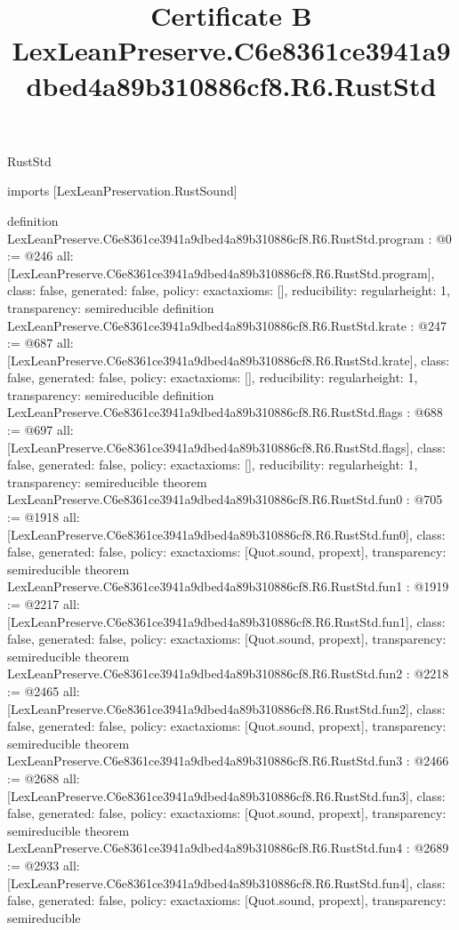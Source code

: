 \begin{lexlean}{RustStd}
\title{Certificate B LexLeanPreserve.C6e8361ce3941a9dbed4a89b310886cf8.R6.RustStd}
\begin{coremodule}
imports [LexLeanPreservation.RustSound]

definition LexLeanPreserve.C6e8361ce3941a9dbed4a89b310886cf8.R6.RustStd.program : @0 := @246 {
  all: [LexLeanPreserve.C6e8361ce3941a9dbed4a89b310886cf8.R6.RustStd.program],
  class: false,
  generated: false,
  policy: exact{axioms: []},
  reducibility: regular{height: 1},
  transparency: semireducible
}
definition LexLeanPreserve.C6e8361ce3941a9dbed4a89b310886cf8.R6.RustStd.krate : @247 := @687 {
  all: [LexLeanPreserve.C6e8361ce3941a9dbed4a89b310886cf8.R6.RustStd.krate],
  class: false,
  generated: false,
  policy: exact{axioms: []},
  reducibility: regular{height: 1},
  transparency: semireducible
}
definition LexLeanPreserve.C6e8361ce3941a9dbed4a89b310886cf8.R6.RustStd.flags : @688 := @697 {
  all: [LexLeanPreserve.C6e8361ce3941a9dbed4a89b310886cf8.R6.RustStd.flags],
  class: false,
  generated: false,
  policy: exact{axioms: []},
  reducibility: regular{height: 1},
  transparency: semireducible
}
theorem LexLeanPreserve.C6e8361ce3941a9dbed4a89b310886cf8.R6.RustStd.fun0 : @705 := @1918 {
  all: [LexLeanPreserve.C6e8361ce3941a9dbed4a89b310886cf8.R6.RustStd.fun0],
  class: false,
  generated: false,
  policy: exact{axioms: [Quot.sound, propext]},
  transparency: semireducible
}
theorem LexLeanPreserve.C6e8361ce3941a9dbed4a89b310886cf8.R6.RustStd.fun1 : @1919 := @2217 {
  all: [LexLeanPreserve.C6e8361ce3941a9dbed4a89b310886cf8.R6.RustStd.fun1],
  class: false,
  generated: false,
  policy: exact{axioms: [Quot.sound, propext]},
  transparency: semireducible
}
theorem LexLeanPreserve.C6e8361ce3941a9dbed4a89b310886cf8.R6.RustStd.fun2 : @2218 := @2465 {
  all: [LexLeanPreserve.C6e8361ce3941a9dbed4a89b310886cf8.R6.RustStd.fun2],
  class: false,
  generated: false,
  policy: exact{axioms: [Quot.sound, propext]},
  transparency: semireducible
}
theorem LexLeanPreserve.C6e8361ce3941a9dbed4a89b310886cf8.R6.RustStd.fun3 : @2466 := @2688 {
  all: [LexLeanPreserve.C6e8361ce3941a9dbed4a89b310886cf8.R6.RustStd.fun3],
  class: false,
  generated: false,
  policy: exact{axioms: [Quot.sound, propext]},
  transparency: semireducible
}
theorem LexLeanPreserve.C6e8361ce3941a9dbed4a89b310886cf8.R6.RustStd.fun4 : @2689 := @2933 {
  all: [LexLeanPreserve.C6e8361ce3941a9dbed4a89b310886cf8.R6.RustStd.fun4],
  class: false,
  generated: false,
  policy: exact{axioms: [Quot.sound, propext]},
  transparency: semireducible
}
\end{coremodule}
\end{lexlean}
